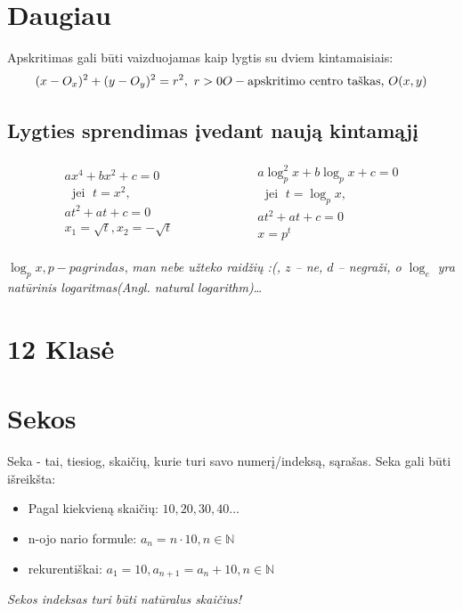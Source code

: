 \documentclass[fleqn]{article} %
\DeclareMathOperator{\jei}{\ jei\ }
\begin{document}
\section{Daugiau}

Apskritimas gali būti vaizduojamas kaip lygtis su dviem kintamaisiais:
\[
    (x - O_x)^2 + (y - O_y)^2 = r^2,\ r > 0 \\ 
    O - \text{apskritimo centro taškas, } O(x, y)
\]

\subsection{Lygties sprendimas įvedant naują kintamąjį}

\begin{align*}
    \begin{aligned}
    ax^4 + bx^2 + c = 0                 \\
    \jei t = x^2,                       \\
    at^2 + at + c = 0                   \\
    x_1 = \sqrt{t}, x_2 = -\sqrt{t}     
    \end{aligned}
    \qquad\qquad\qquad
    \begin{aligned}
    a\log^2_p x + b\log_p x + c = 0     \\
    \jei t = \log_p x,                  \\
    at^2 + at + c = 0                   \\
    x = p^t
    \end{aligned}
\end{align*}

$\log_p x, p - pagrindas$, \textit{man nebe užteko raidžių :(, $z$ -- ne, $d$ -- negraži, o $\log_e$ yra natūrinis logaritmas(Angl. natural logarithm)}\dots

\section{12 Klasė}

\section{Sekos}

Seka - tai, tiesiog, skaičių, kurie turi savo numerį/indeksą, sąrašas. 
Seka gali būti išreikšta: 
\begin{itemize}
    \item Pagal kiekvieną skaičių: $10, 20, 30, 40 \dots$
    \item n-ojo nario formule: $a_n = n \cdot 10, n \in \mathbb{N}$
    \item rekurentiškai: $a_1 = 10, a_{n + 1} = a_n + 10, n \in \mathbb{N}$
\end{itemize}
\textit{Sekos indeksas turi būti natūralus skaičius!}
\end{document}
